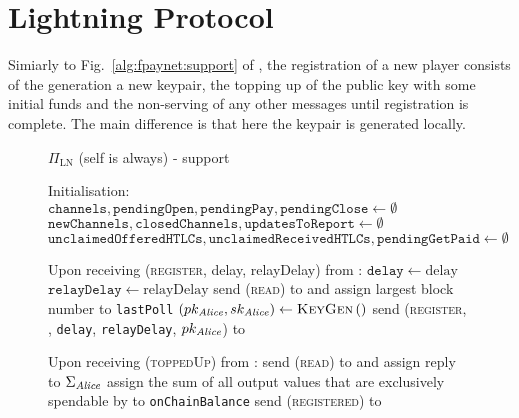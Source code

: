 \section{Lightning Protocol}
  \label{appendix:protocol}

  Simiarly to Fig.~\ref{alg:fpaynet:support} of \fpaynet, the registration of a
  new player consists of the generation a new keypair, the topping up of the
  public key with some initial funds and the non-serving of any other messages
  until registration is complete. The main difference is that here the keypair
  is generated locally.

  \begin{figure}[H]
    \begin{protocolbox}{$\Pi_{\mathrm{LN}}$ (self is \alice{} always) - support}
      \begin{algorithmic}[1]
        \State Initialisation:
        \Indent
          \State $\mathtt{channels}, \mathtt{pendingOpen}, \mathtt{pendingPay},
          \mathtt{pendingClose} \gets \emptyset$
          \State $\mathtt{newChannels}, \mathtt{closedChannels},
          \mathtt{updatesToReport} \gets \emptyset$
          \State $\mathtt{unclaimedOfferedHTLCs},
          \mathtt{unclaimedReceivedHTLCs}, \mathtt{pendingGetPaid} \gets
          \emptyset$
        \EndIndent
        \Statex

        \State Upon receiving (\textsc{register}, delay, relayDelay) from
        \environment:
        \Indent
          \State $\mathtt{delay} \gets \mathrm{delay}$ 
          \label{alg:protocol:support:delay}
          \State $\mathtt{relayDelay} \gets \mathrm{relayDelay}$
          \State send (\textsc{read}) to \ledger{} and assign largest block
          number to \texttt{lastPoll} %
          \label{alg:protocol:support:lastpoll}
          \State $\left(pk_{\mathit{Alice}}, sk_{\mathit{Alice}}\right) \gets
          \textsc{KeyGen}\left(\right)$
          \label{alg:protocol:support:keygen}
          \State send (\textsc{register}, \alice, \texttt{delay},
          \texttt{relayDelay}, $pk_{\mathit{Alice}}$) to \environment
        \EndIndent
        \Statex

        \State Upon receiving (\textsc{toppedUp}) from \environment:
        \Indent
          \State send (\textsc{read}) to \ledger{} and assign reply to
          $\Sigma_{\mathit{Alice}}$
          \State assign the sum of all output values that are exclusively
          spendable by \alice{} to \texttt{onChainBalance}
          \State send (\textsc{registered}) to \environment
        \EndIndent
        \Statex


\end{algorithmic}
\end{protocolbox}
\end{figure}

